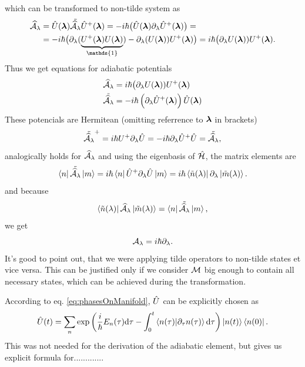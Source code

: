 which can be transformed to non-tilde system as
\begin{equation}
    \begin{split}
        \AA_\lambda&=\U(\llambda)\tilde{\AA_\lambda}\U^+(\llambda) = -i\hbar\big(\U(\llambda)\partial_\lambda \U^+(\llambda)\big) =\\
        &= -i\hbar\big(\partial_\lambda(\underbrace{U^+(\llambda)U(\llambda)}_{\mathds{1}})-\partial_\lambda(U(\llambda))U^+(\llambda) \big) =i\hbar \big(\partial_\lambda U(\llambda))U^+(\llambda).
    \end{split}
\end{equation}
Thus we get equations for adiabatic potentials
\begin{align}
    \AA_\lambda&=i\hbar \big(\partial_\lambda U(\llambda))U^+(\llambda)
    \label{eq:adiabaticPotential}\\
    \tilde{\AA_\lambda} &= -i\hbar\left(\partial_\lambda \U^+(\llambda)\right)\U(\llambda)
    \label{eq:adiabaticPotentialTilde}
\end{align}
These potencials are Hermitean (omitting referrence to $\llambda$ in brackets)
\begin{equation}
     \tilde{\AA_\lambda}^+=i\hbar U^+\partial_\lambda\U=-i\hbar\partial_\lambda\U^+\U = \tilde{\AA_\lambda} ,
\end{equation}
analogically holds for $\AA_\lambda$ and using the eigenbasis of $\HH$, the matrix elements are
\begin{equation}
    \bra{n}\tilde{\AA_\lambda}\ket{m}=i\hbar\bra{n}\U^+\partial_\lambda\U\ket{m} = i\hbar\bra{\tilde n(\lambda)}\partial_\lambda\ket{\tilde m(\lambda)}.
\end{equation}
and because
\begin{equation}
    \bra{\tilde n(\lambda)}\AA_\lambda\ket{\tilde m(\lambda)}= \bra{n}\tilde{\AA_\lambda}\ket{m},
\end{equation}
we get
\begin{equation}
    \A_\lambda = i\hbar\partial_\lambda.
    \label{eq:adiabaticPotentialDefinition}
\end{equation}
It's good to point out, that we were applying tilde operators to non-tilde states et vice versa. This can be justified only if we consider $\M$ big enough to contain all necessary states, which can be achieved during the transformation.


According to eq. \ref{eq:phasesOnManifold}, $\U$ can be explicitly chosen as
\begin{equation}
    \U(t)=\sum_n \exp\left(\frac{i}{\hbar}E_n(\tau)\d \tau - \int_0^t \braket{n(\tau)|\partial_\tau n(\tau)}\d\tau\right)\ket{n(t)}\bra{n(0)}.
\end{equation}
This was not needed for the derivation of the adiabatic element, but gives us explicit formula for.............

